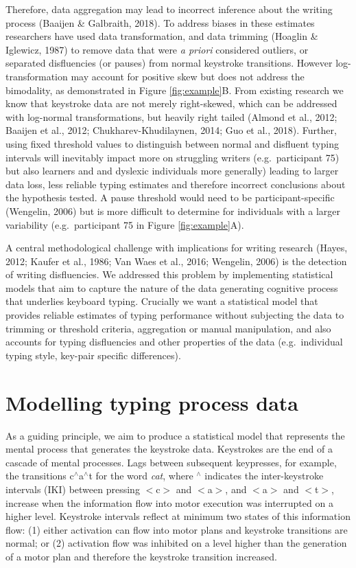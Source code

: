 \documentclass[
  english,
  man,mask,floatsintext]{apa7}
\begin{document}
Therefore, data aggregation may lead to incorrect inference about the writing process (Baaijen \& Galbraith, 2018). To address biases in these estimates researchers have used data transformation, and data trimming (Hoaglin \& Iglewicz, 1987) to remove data that were \emph{a priori} considered outliers, or separated disfluencies (or pauses) from normal keystroke transitions. However log-transformation may account for positive skew but does not address the bimodality, as demonstrated in Figure \ref{fig:example}B. From existing research we know that keystroke data are not merely right-skewed, which can be addressed with log-normal transformations, but heavily right tailed (Almond et al., 2012; Baaijen et al., 2012; Chukharev-Khudilaynen, 2014; Guo et al., 2018). Further, using fixed threshold values to distinguish between normal and disfluent typing intervals will inevitably impact more on struggling writers (e.g.~participant 75) but also learners and and dyslexic individuals more generally) leading to larger data loss, less reliable typing estimates and therefore incorrect conclusions about the hypothesis tested. A pause threshold would need to be participant-specific (Wengelin, 2006) but is more difficult to determine for individuals with a larger variability (e.g.~participant 75 in Figure \ref{fig:example}A).

A central methodological challenge with implications for writing research (Hayes, 2012; Kaufer et al., 1986; Van Waes et al., 2016; Wengelin, 2006) is the detection of writing disfluencies. We addressed this problem by implementing statistical models that aim to capture the nature of the data generating cognitive process that underlies keyboard typing. Crucially we want a statistical model that provides reliable estimates of typing performance without subjecting the data to trimming or threshold criteria, aggregation or manual manipulation, and also accounts for typing disfluencies and other properties of the data (e.g.~individual typing style, key-pair specific differences).

\hypertarget{modelling-typing-process-data}{%
\section{Modelling typing process data}\label{modelling-typing-process-data}}

As a guiding principle, we aim to produce a statistical model that represents the mental process that generates the keystroke data. Keystrokes are the end of a cascade of mental processes. Lags between subsequent keypresses, for example, the transitions c\(^{\wedge}\)a\(^{\wedge}\)t for the word \emph{cat}, where \(^{\wedge}\) indicates the inter-keystroke intervals (IKI) between pressing \(<\)c\(>\) and \(<\)a\(>\), and \(<\)a\(>\) and \(<\)t\(>\), increase when the information flow into motor execution was interrupted on a higher level. Keystroke intervals reflect at minimum two states of this information flow: (1) either activation can flow into motor plans and keystroke transitions are normal; or (2) activation flow was inhibited on a level higher than the generation of a motor plan and therefore the keystroke transition increased.
\end{document}

